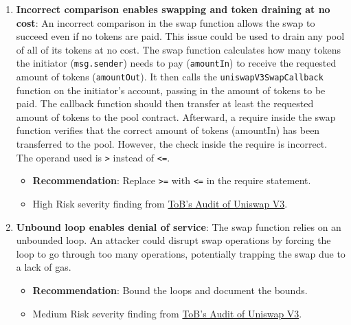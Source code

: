 \begin{enumerate}
\item\textbf{Incorrect comparison enables swapping and token draining at no cost}: An incorrect comparison in the swap function allows the swap to succeed even if no tokens are paid. This issue could be used to drain any pool of all of its tokens at no cost. The swap function calculates how many tokens the initiator (\verb|msg.sender|) needs to pay (\verb|amountIn|) to receive the requested amount of tokens (\verb|amountOut|). It then calls the \verb|uniswapV3SwapCallback| function on the initiator’s account, passing in the amount of tokens to be paid. The callback function should then transfer at least the requested amount of tokens to the pool contract. Afterward, a require inside the swap function verifies that the correct amount of tokens (amountIn) has been transferred to the pool. However, the check inside the require is incorrect. The operand used is \verb|>| instead of \verb|<=|.
	\begin{itemize}
	\item\textbf{Recommendation}: Replace \verb|>=| with \verb|<=| in the require statement.
	\item High Risk severity finding from \href{https://github.com/Uniswap/uniswap-v3-core/blob/main/audits/tob/audit.pdf}{ToB’s Audit of Uniswap V3}.
	\end{itemize}

\item\textbf{Unbound loop enables denial of service}: The swap function relies on an unbounded loop. An attacker could disrupt swap operations by forcing the loop to go through too many operations, potentially trapping the swap due to a lack of gas.
	\begin{itemize}
	\item\textbf{Recommendation}: Bound the loops and document the bounds.
	\item Medium Risk severity finding from \href{https://github.com/Uniswap/uniswap-v3-core/blob/main/audits/tob/audit.pdf}{ToB’s Audit of Uniswap V3}.
	\end{itemize}


\end{enumerate}
